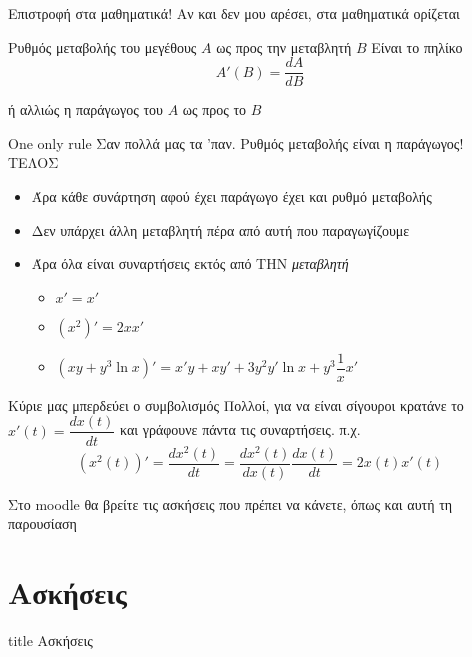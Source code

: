\documentclass{presentation}
\begin{document}
\begin{frame}{Επιστροφή στα μαθηματικά!}
  Αν και δεν μου αρέσει, στα μαθηματικά ορίζεται
  \begin{block}{Ρυθμός μεταβολής του μεγέθους $A$ ως προς την μεταβλητή $B$}
    Είναι το πηλίκο
    $$Α'(Β)=\frac{dA}{dΒ}$$
  \end{block}
  ή αλλιώς η παράγωγος του $Α$ ως προς το $Β$
\end{frame}

\begin{frame}{One only rule}
  Σαν πολλά μας τα 'παν. Ρυθμός μεταβολής είναι η παράγωγος! ΤΕΛΟΣ
  \begin{itemize}
    \item<2-> Άρα κάθε συνάρτηση αφού έχει παράγωγο έχει και ρυθμό μεταβολής
    \item<3-> Δεν υπάρχει άλλη μεταβλητή πέρα από αυτή που παραγωγίζουμε
    \item<4-> Άρα όλα είναι συναρτήσεις εκτός από ΤΗΝ \emph{μεταβλητή}
          \begin{itemize}
            \item<5-> $x'=x'$
            \item<6-> $(x^2)'=2xx'$
            \item<7-> $(xy+y^3\ln x)'=x'y+xy'+3y^2y'\ln x+y^3\dfrac{1}{x}x'$
          \end{itemize}
  \end{itemize}
\end{frame}

\begin{frame}{Κύριε μας μπερδεύει ο συμβολισμός}
  Πολλοί, για να είναι σίγουροι κρατάνε το $x'(t)=\dfrac{dx(t)}{dt}$ και γράφουνε πάντα τις συναρτήσεις. π.χ.
  $$(x^2(t))'=\frac{dx^2(t)}{dt}=\frac{dx^2(t)}{dx(t)}\frac{dx(t)}{dt}=2x(t)x'(t)$$
\end{frame}

\begin{frame}[noframenumbering]
  Στο moodle θα βρείτε τις ασκήσεις που πρέπει να κάνετε, όπως και αυτή τη παρουσίαση
\end{frame}

\section{Ασκήσεις}

\begin{frame}[noframenumbering]
  \vfill
  \centering
  \begin{beamercolorbox}[sep=8pt,center,shadow=true,rounded=true]{title}
    Ασκήσεις
  \end{beamercolorbox}
  \vfill
\end{frame}
\end{document}
